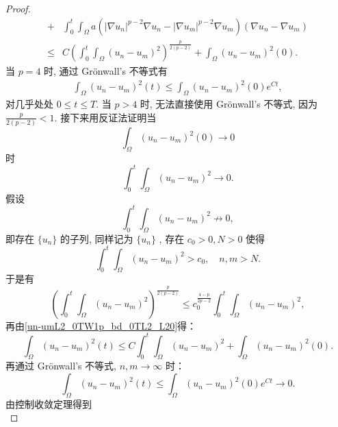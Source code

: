 \documentclass[twoside,longtitle]{LZUthesis}
\theoremstyle{definition}
\numberwithin{equation}{chapter}
\newcommand*\abs[1]{\lvert#1\rvert}
\newcommand*\Brace[1]{\lbrace#1\rbrace}
\begin{document}
\begin{proof}
\begin{equation}
\begin{split}
			+{} & \int_{0}^{t}\int_{\Omega}a
			\left(\abs{\nabla u_n}^{p-2}\nabla u_n
			- \abs{\nabla u_m}^{p-2}\nabla u_m\right)
			\left(\nabla u_n - \nabla u_m\right)\\
			\leq{} & C\left(\int_0^t\int_{\Omega}
			\left(u_n-u_m\right)^2\right)^{\frac{p}{2(p-2)}}
			+ \int_{\Omega}\left(u_n-u_m\right)^2(0).
		\end{split}
	\end{equation}
	当 $p=4$ 时, 通过 Gr\"onwall's 不等式有
	\begin{equation}
		\begin{split}
			\int_{\Omega}\left( u_n-u_m \right)^2(t)
			\leq \int_{\Omega}\left(u_n-u_m\right)^2(0)e^{Ct} ,
		\end{split}
	\end{equation}
	对几乎处处 $0 \leq t \leq T$. 当 $p>4$ 时,
	无法直接使用 Gr\"onwall's 不等式,
	因为 $\frac{p}{2(p-2)}<1$. 接下来用反证法证明当
	\begin{equation}
		\int_{\Omega}\left(u_n-u_m\right)^2(0) \to 0
	\end{equation}
	时
	\begin{equation}
		\int_0^t\int_{\Omega}\left(u_n-u_m\right)^2 \to 0.
	\end{equation}
	假设
	\begin{equation*}
		\int_0^t\int_{\Omega}\left(u_n-u_m\right)^2 \not\to 0,
	\end{equation*}
	即存在 $\Brace{u_n}$ 的子列, 同样记为 $\Brace{u_n}$ , 存在 $c_0 > 0, N > 0$ 使得
	\begin{equation*}
		\int_0^t\int_{\Omega}\left(u_n-u_m\right)^2 > c_0, \quad n, m > N.
	\end{equation*}
	于是有
	\begin{equation*}
		\left(\int_0^t\int_{\Omega}\left(u_n-u_m\right)^2\right)^{\frac{p}{2(p-2)}}
		\leq c_0^{\frac{4-p}{2p-2}}\int_0^t\int_{\Omega}\left(u_n-u_m\right)^2,
	\end{equation*}
	再由\cref{un-umL2_0TW1p_bd_0TL2_L20}得：
	\begin{equation}
		\int_{\Omega}\left(u_n-u_m\right)^2(t)
		\leq C\int_0^t\int_{\Omega}\left(u_n-u_m\right)^2
		+ \int_{\Omega}\left(u_n-u_m\right)^2(0).
	\end{equation}
	再通过 Gr\"onwall's 不等式, $n, m \to \infty$ 时：
	\begin{equation}
		\int_{\Omega}\left( u_n-u_m \right)^2(t)
			\leq \int_{\Omega}\left(u_n-u_m\right)^2(0)e^{Ct} \to 0.
	\end{equation}
	由控制收敛定理得到
	\begin{equation}

\end{equation}
\end{proof}
\end{document}
